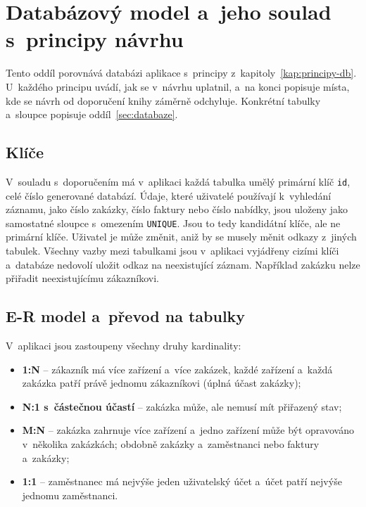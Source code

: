 \section{Databázový model a~jeho soulad s~principy návrhu}\label{sec:db-soulad}

Tento oddíl porovnává databázi aplikace s~principy z~kapitoly~\ref{kap:principy-db}. U~každého principu uvádí, jak se v~návrhu uplatnil, a~na konci popisuje místa, kde se návrh od doporučení knihy záměrně odchyluje. Konkrétní tabulky a~sloupce popisuje oddíl~\ref{sec:databaze}.

\subsection{Klíče}

V~souladu s~doporučením má v~aplikaci každá tabulka umělý primární klíč \texttt{id}, celé číslo generované databází. Údaje, které uživatelé používají k~vyhledání záznamu, jako číslo zakázky, číslo faktury nebo číslo nabídky, jsou uloženy jako samostatné sloupce s~omezením \texttt{UNIQUE}. Jsou to tedy kandidátní klíče, ale ne primární klíče. Uživatel je může změnit, aniž by se musely měnit odkazy z~jiných tabulek. Všechny vazby mezi tabulkami jsou v~aplikaci vyjádřeny cizími klíči a~databáze nedovolí uložit odkaz na neexistující záznam. Například zakázku nelze přiřadit neexistujícímu zákazníkovi.

\subsection{E-R model a~převod na tabulky}

V~aplikaci jsou zastoupeny všechny druhy kardinality:
\begin{itemize}
\item \textbf{1:N} -- zákazník má více zařízení a~více zakázek, každé zařízení a~každá zakázka patří právě jednomu zákazníkovi (úplná účast zakázky);
\item \textbf{N:1 s~částečnou účastí} -- zakázka může, ale nemusí mít přiřazený stav;
\item \textbf{M:N} -- zakázka zahrnuje více zařízení a~jedno zařízení může být opravováno v~několika zakázkách; obdobně zakázky a~zaměstnanci nebo faktury a~zakázky;
\item \textbf{1:1} -- zaměstnanec má nejvýše jeden uživatelský účet a~účet patří nejvýše jednomu zaměstnanci.
\end{itemize}

